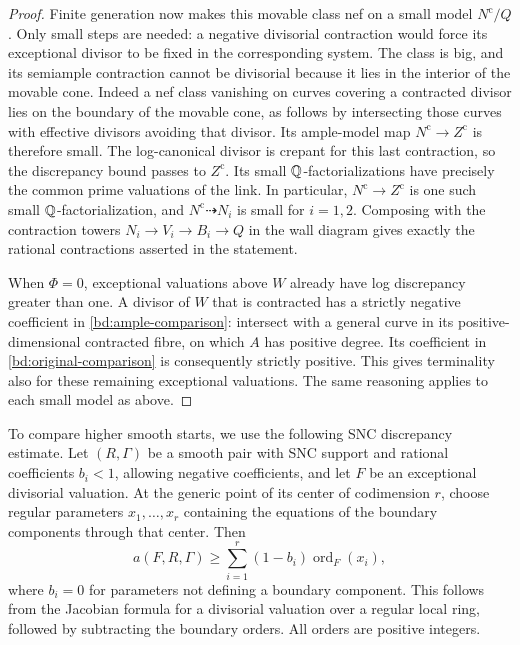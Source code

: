 \begin{proof}
Finite generation now makes this movable class nef on a small
model $N^{\mathrm c}/Q$.  Only small steps are needed: a
negative divisorial contraction would force its exceptional
divisor to be fixed in the corresponding system.  The class
is big, and its semiample contraction cannot be divisorial
because it lies in the interior of the movable cone.  Indeed
a nef class vanishing on curves covering a contracted divisor
lies on the boundary of the movable cone, as follows by
intersecting those curves with effective divisors avoiding
that divisor. Its ample-model map $N^{\mathrm c}\to Z^{\mathrm c}$
is therefore small.
The log-canonical divisor is crepant for this last contraction,
so the discrepancy bound passes to $Z^{\mathrm c}$. Its small
$\mathbb Q$-factorializations have precisely the common prime
valuations of the link. In particular, $N^{\mathrm c}\to Z^{\mathrm c}$
is one such small $\mathbb Q$-factorialization, and
$N^{\mathrm c}\dashrightarrow N_i$ is small for $i=1,2$.
Composing with the contraction towers
$N_i\to V_i\to B_i\to Q$ in the wall diagram gives exactly
the rational contractions asserted in the statement.

When $\Phi=0$, exceptional valuations above $W$ already have
log discrepancy greater than one.  A divisor of $W$ that is
contracted has a strictly negative coefficient in
\eqref{bd:ample-comparison}: intersect with a general curve
in its positive-dimensional contracted fibre, on which $A$
has positive degree.  Its coefficient in
\eqref{bd:original-comparison} is consequently strictly
positive.  This gives terminality also for these remaining
exceptional valuations.  The same reasoning applies to each
small model as above.
\end{proof}

To compare higher smooth starts, we use the following SNC discrepancy
estimate. Let $(R,\Gamma)$ be a smooth pair with SNC support and rational
coefficients $b_i<1$, allowing negative coefficients, and let $F$ be an
exceptional divisorial valuation. At the generic point of its center of
codimension $r$, choose regular parameters $x_1,\ldots,x_r$ containing
the equations of the boundary components through that center. Then
\begin{equation}\label{bd:snc-discrepancy}
 a(F,R,\Gamma)\geq
 \sum_{i=1}^r(1-b_i)\operatorname{ord}_F(x_i),
\end{equation}
where $b_i=0$ for parameters not defining a boundary component.
This follows from the Jacobian formula for a divisorial valuation
over a regular local ring, followed by subtracting the boundary
orders. All orders are positive integers.

